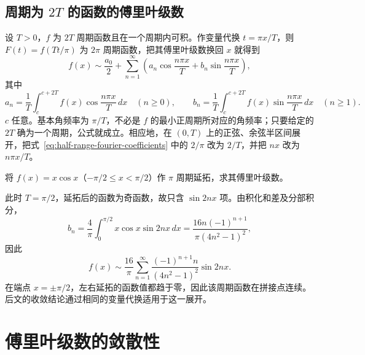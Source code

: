\subsection{周期为 \texorpdfstring{$2T$}{2T} 的函数的傅里叶级数}
\label{subsec:fourier-series-of-two-t-periodic-functions}

设 $T>0$，$f$ 为 $2T$ 周期函数且在一个周期内可积。作变量代换 $t=\pi x/T$，则 $F(t)=f(Tt/\pi)$ 为 $2\pi$ 周期函数，把其傅里叶级数换回 $x$ 就得到
\begin{equation}
    f(x)\sim\frac{a_0}{2}
       +\sum_{n=1}^\infty\left(
          a_n\cos\frac{n\pi x}{T}
          +b_n\sin\frac{n\pi x}{T}\right),
    \label{eq:fourier-series-general-period}
\end{equation}
其中
\begin{equation}
    a_n=\frac1T\int_c^{c+2T}f(x)\cos\frac{n\pi x}{T}\,dx\quad(n\geq0),
    \qquad
    b_n=\frac1T\int_c^{c+2T}f(x)\sin\frac{n\pi x}{T}\,dx\quad(n\geq1).
    \label{eq:fourier-coefficients-general-period}
\end{equation}
$c$ 任意。基本角频率为 $\pi/T$，不必是 $f$ 的最小正周期所对应的角频率；只要给定的 $2T$ 确为一个周期，公式就成立。相应地，在 $(0,T)$ 上的正弦、余弦半区间展开，把式~\eqref{eq:half-range-fourier-coefficients} 中的 $2/\pi$ 改为 $2/T$，并把 $nx$ 改为 $n\pi x/T$。

\begin{example}
\label{ex:fourier-x-cos-x-period-pi}
将 $f(x)=x\cos x$（$-\pi/2\leq x<\pi/2$）作 $\pi$ 周期延拓，求其傅里叶级数。
\end{example}

\begin{solve}
此时 $T=\pi/2$，延拓后的函数为奇函数，故只含 $\sin2nx$ 项。由积化和差及分部积分，
\[
    b_n=\frac4\pi\int_0^{\pi/2}x\cos x\sin2nx\,dx
       =\frac{16n(-1)^{n+1}}{\pi(4n^2-1)^2},
\]
因此
\begin{equation}
    f(x)\sim\frac{16}{\pi}\sum_{n=1}^\infty
             \frac{(-1)^{n+1}n}{(4n^2-1)^2}\sin2nx.
    \label{eq:fourier-x-cos-x-period-pi}
\end{equation}
在端点 $x=\pm\pi/2$，左右延拓的函数值都趋于零，因此该周期函数在拼接点连续。后文的收敛结论通过相同的变量代换适用于这一展开。
\end{solve}

\section{傅里叶级数的敛散性}
\label{sec:convergence-of-fourier-series}

